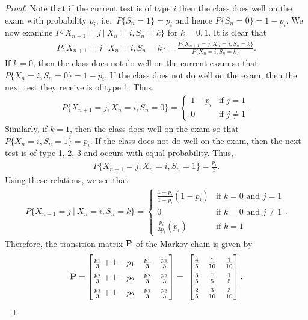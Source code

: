 \begin{proof}
  Note that if the current test is of type $i$ then the class does well on the exam
  with probability $p_i$, i.e.\ $P\{S_n = 1\} = p_i$ and hence $P\{S_n = 0\} = 1 - p_i$.
  We now examine $P\{X_{n+1} = j \ |\ X_n = i, S_n = k\}$ for $k=0,1$. It is clear
  that
  \begin{align*}
    P\{X_{n+1} = j \ |\ X_n = i, S_n = k\} = \frac{P\{X_{n+1} = j, X_n = i, S_n = k\}}{P\{X_n = i, S_n = k\}}.
  \end{align*}
  If $k = 0$, then the class does not do well on the current exam so that $P\{X_n = i, S_n = 0\} = 1 - p_i$.
  If the class does not do well on the exam, then the next test they receive is of type 1.
  Thus,
  \begin{align*}
    P\{X_{n+1} = j, X_n = i, S_n = 0\} =
    \begin{cases}
     1 - p_i & \text{if $j = 1$} \\
     0 & \text{if $j \neq 1$}
    \end{cases}.
  \end{align*}
  Similarly, if $k=1$, then the class does well on the exam so that $P\{X_n = i, S_n = 1\} = p_i$.
  If the class does not do well on the exam, then the next test is of type 1, 2, 3 and occurs with equal probability.
  Thus,
  \begin{align*}
    P\{X_{n+1} = j, X_n = i, S_n = 1\} = \frac{p_i}{3}.
  \end{align*}
  Using these relations, we see that
  \begin{align*}
    P\{X_{n+1} = j \ |\ X_n = i, S_n = k\} =
    \begin{cases}
      \frac{1-p_i}{1-p_i}(1 - p_i) & \text{if $k=0$ and $j = 1$}\\
      0 & \text{if $k=0$ and $j \neq 1$}\\
      \frac{p_i}{3p_i}(p_i) & \text{if $k=1$}
    \end{cases}.
  \end{align*}
  Therefore, the transition matrix $\bold{P}$ of the Markov chain is given by
  \begin{align*}
    \bold{P}
    =
    \renewcommand\arraystretch{1.5}
    \begin{bmatrix}
      \frac{p_1}{3} + 1 - p_1 & \frac{p_1}{3} & \frac{p_1}{3} \\
      \frac{p_2}{3} + 1 - p_2 & \frac{p_2}{3} & \frac{p_2}{3} \\
      \frac{p_3}{3} + 1 - p_2 & \frac{p_3}{3} & \frac{p_3}{3} \\
    \end{bmatrix}
    = \
    \begin{bmatrix}
      \frac{4}{5} & \frac{1}{10} & \frac{1}{10} \\
      \frac{3}{5} & \frac{1}{5} & \frac{1}{5} \\
      \frac{2}{5} & \frac{3}{10} & \frac{3}{10} \\
    \end{bmatrix}.
  \end{align*}


\end{proof}
